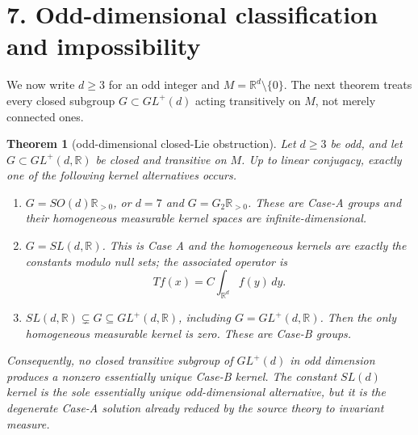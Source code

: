 \documentclass[11pt]{article}
\newtheorem{theorem}{Theorem}
\newcommand{\R}{\mathbb R}
\begin{document}
\section*{7. Odd-dimensional classification and impossibility}

We now write $d\geq3$ for an odd integer and $M=\R^d\setminus\{0\}$.  The next theorem treats every closed subgroup $G\subset GL^+(d)$ acting transitively on $M$, not merely connected ones.

\begin{theorem}[odd-dimensional closed-Lie obstruction]\label{thm:odd}
Let $d\geq3$ be odd, and let $G\subset GL^+(d,\R)$ be closed and transitive on $M$.  Up to linear conjugacy, exactly one of the following kernel alternatives occurs.
\begin{enumerate}
\item $G=SO(d)\R_{>0}$, or $d=7$ and $G=G_2\R_{>0}$.  These are Case-A groups and their homogeneous measurable kernel spaces are infinite-dimensional.
\item $G=SL(d,\R)$.  This is Case A and the homogeneous kernels are exactly the constants modulo null sets; the associated operator is
\[
 Tf(x)=C\int_{\R^d}f(y)\,dy.
\]
\item $SL(d,\R)\subsetneq G\subseteq GL^+(d,\R)$, including $G=GL^+(d,\R)$.  Then the only homogeneous measurable kernel is zero.  These are Case-B groups.
\end{enumerate}
Consequently, no closed transitive subgroup of $GL^+(d)$ in odd dimension produces a nonzero essentially unique Case-B kernel.  The constant $SL(d)$ kernel is the sole essentially unique odd-dimensional alternative, but it is the degenerate Case-A solution already reduced by the source theory to invariant measure.
\end{theorem}
\end{document}
